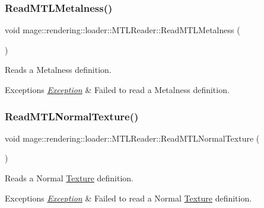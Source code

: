 \subsubsection{\texorpdfstring{Read\+M\+T\+L\+Metalness()}{ReadMTLMetalness()}}
{\footnotesize\ttfamily void mage\+::rendering\+::loader\+::\+M\+T\+L\+Reader\+::\+Read\+M\+T\+L\+Metalness (\begin{DoxyParamCaption}{ }\end{DoxyParamCaption})\hspace{0.3cm}{\ttfamily [private]}}

Reads a Metalness definition.


\begin{DoxyExceptions}{Exceptions}
{\em \mbox{\hyperlink{classmage_1_1_exception}{Exception}}} & Failed to read a Metalness definition. \\
\hline
\end{DoxyExceptions}
\mbox{\label{classmage_1_1rendering_1_1loader_1_1_m_t_l_reader_afc25c8d259af6fbeb06a1e189f247e75}} 
\subsubsection{\texorpdfstring{Read\+M\+T\+L\+Normal\+Texture()}{ReadMTLNormalTexture()}}
{\footnotesize\ttfamily void mage\+::rendering\+::loader\+::\+M\+T\+L\+Reader\+::\+Read\+M\+T\+L\+Normal\+Texture (\begin{DoxyParamCaption}{ }\end{DoxyParamCaption})\hspace{0.3cm}{\ttfamily [private]}}

Reads a Normal \mbox{\hyperlink{classmage_1_1rendering_1_1_texture}{Texture}} definition.


\begin{DoxyExceptions}{Exceptions}
{\em \mbox{\hyperlink{classmage_1_1_exception}{Exception}}} & Failed to read a Normal \mbox{\hyperlink{classmage_1_1rendering_1_1_texture}{Texture}} definition. \\
\hline
\end{DoxyExceptions}
\mbox{\label{classmage_1_1rendering_1_1loader_1_1_m_t_l_reader_acfafc2485c4b84ef84360e35ac8247eb}} 
